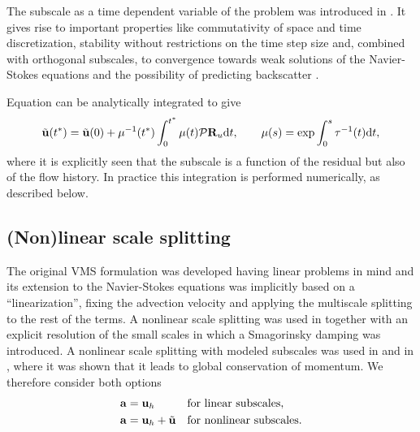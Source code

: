 The subscale as a time dependent variable of the problem was introduced in \cite{codina_stabilized_2002,codina_time_2007}. It gives rise to important properties like commutativity of space and time discretization, stability without restrictions on the time step size \cite{codina_time_2007,Badia2009a} and, combined with orthogonal subscales, to convergence towards weak solutions of the Navier-Stokes equations \cite{Badia2013Convergence} and the possibility of predicting backscatter \cite{Codina-chap-2011,Principe2009}. 

Equation  can be analytically integrated to give
\begin{equation}
\label{eq:exact_sgs}
\tilde{{\bf u}}(t^*)=\tilde{{\bf u}}(0) + \mu^{-1}(t^*) \int_0^{t^*} \mu(t) \mathcal{P}{\bf R}_u {\rm d}t, \quad \quad \mu(s)=\exp \int_0^s \tau^{-1}(t){\rm d}t,
\end{equation}
where it is explicitly seen that the subscale is a function of the residual but also of the flow history. In practice this integration is performed numerically, as described below.

\subsection{(Non)linear scale splitting}
The original VMS formulation \cite{hughes_multiscale_1995,hughes_variational_1998} was developed having linear problems in mind and its extension to the Navier-Stokes equations was implicitly based on a ``linearization'', fixing the advection velocity and applying the multiscale splitting to the rest of the terms. A nonlinear scale splitting was used in \cite{Hughes2000,hughes_large_2001} together with an explicit resolution of the small scales in which a Smagorinsky damping was introduced. A nonlinear scale splitting with modeled subscales was used in \cite{codina_stabilized_2002, bazilevs_variational_2007} and in \cite{codina_time_2007}, where it was shown that it leads to global conservation of momentum. We therefore consider both options
\begin{align}
\label{eq-a_lin}
&{\bf a}={\bf u}_h&&\mbox{for linear subscales},\\
\label{eq-a_nl}
&{\bf a}={\bf u}_h+\tilde{{\bf u}}&&\mbox{for nonlinear subscales}.
\end{align}

